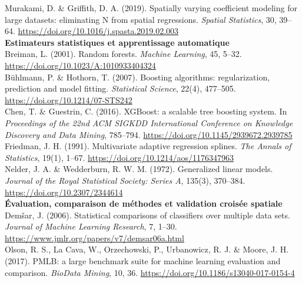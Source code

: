 \documentclass[11pt,a4paper]{article}
\begin{document}
{Murakami, D. \& Griffith, D. A. (2019). Spatially varying coefficient modeling for large datasets: eliminating N from spatial regressions. \textit{Spatial Statistics}, 30, 39--64. \url{https://doi.org/10.1016/j.spasta.2019.02.003}\\[0.4cm]

\textbf{Estimateurs statistiques et apprentissage automatique}\\[0.15cm]

Breiman, L. (2001). Random forests. \textit{Machine Learning}, 45, 5--32. \url{https://doi.org/10.1023/A:1010933404324}\\[0.2cm]

Bühlmann, P. \& Hothorn, T. (2007). Boosting algorithms: regularization, prediction and model fitting. \textit{Statistical Science}, 22(4), 477--505. \url{https://doi.org/10.1214/07-STS242}\\[0.2cm]

Chen, T. \& Guestrin, C. (2016). XGBoost: a scalable tree boosting system. In \textit{Proceedings of the 22nd ACM SIGKDD International Conference on Knowledge Discovery and Data Mining}, 785--794. \url{https://doi.org/10.1145/2939672.2939785}\\[0.2cm]

Friedman, J. H. (1991). Multivariate adaptive regression splines. \textit{The Annals of Statistics}, 19(1), 1--67. \url{https://doi.org/10.1214/aos/1176347963}\\[0.2cm]

Nelder, J. A. \& Wedderburn, R. W. M. (1972). Generalized linear models. \textit{Journal of the Royal Statistical Society: Series A}, 135(3), 370--384. \url{https://doi.org/10.2307/2344614}\\[0.4cm]

\textbf{Évaluation, comparaison de méthodes et validation croisée spatiale}\\[0.15cm]

Demšar, J. (2006). Statistical comparisons of classifiers over multiple data sets. \textit{Journal of Machine Learning Research}, 7, 1--30. \url{https://www.jmlr.org/papers/v7/demsar06a.html}\\[0.2cm]

Olson, R. S., La Cava, W., Orzechowski, P., Urbanowicz, R. J. \& Moore, J. H. (2017). PMLB: a large benchmark suite for machine learning evaluation and comparison. \textit{BioData Mining}, 10, 36. \url{https://doi.org/10.1186/s13040-017-0154-4}\\[0.2cm]

}
\end{document}
